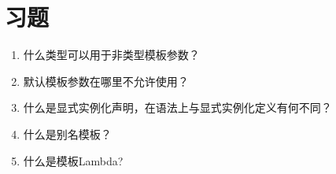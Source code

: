 \section{习题}
\begin{enumerate}
  \item 什么类型可以用于非类型模板参数？
  \item 默认模板参数在哪里不允许使用？
  \item 什么是显式实例化声明，在语法上与显式实例化定义有何不同？
  \item 什么是别名模板？
  \item 什么是模板Lambda?
\end{enumerate}